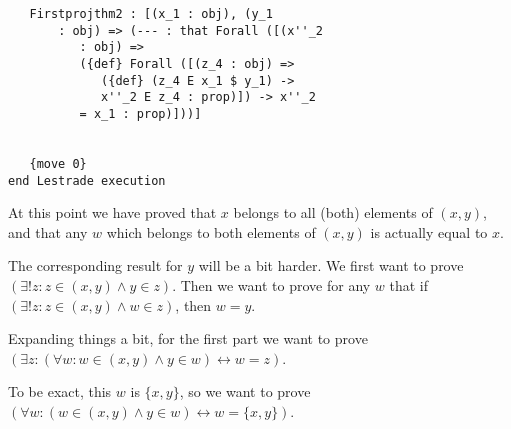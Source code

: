 \documentclass[12pt]{article}
\begin{document}
\begin{verbatim}
   Firstprojthm2 : [(x_1 : obj), (y_1 
       : obj) => (--- : that Forall ([(x''_2 
          : obj) => 
          ({def} Forall ([(z_4 : obj) => 
             ({def} (z_4 E x_1 $ y_1) -> 
             x''_2 E z_4 : prop)]) -> x''_2 
          = x_1 : prop)]))]


   {move 0}
end Lestrade execution
\end{verbatim}

At this point we have proved that $x$ belongs to all (both) elements of $(x,y)$, and that any $w$ which belongs to both elements of $(x,y)$ is actually equal to $x$.

The corresponding result for $y$ will be a bit harder.  We first want to prove $(\exists! z: z \in (x,y) \wedge y \in z)$.
Then we want to prove for any $w$ that if $(\exists! z: z \in (x,y) \wedge w \in z)$, then $w=y$.

Expanding things a bit, for the first part we want to prove $(\exists z:(\forall w: w \in (x,y) \wedge y \in w) \leftrightarrow w=z)$.

To be exact, this $w$ is $\{x,y\}$, so we want to prove $(\forall w: (w \in (x,y) \wedge y \in w) \leftrightarrow w = \{x,y\})$.
\end{document}
